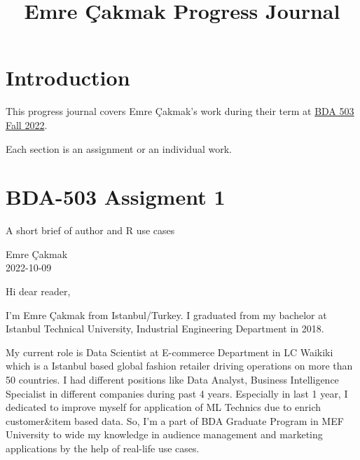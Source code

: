 \documentclass[
  letterpaper,
  DIV=11,
  numbers=noendperiod]{scrreprt}
\title{Emre Çakmak Progress Journal}
\author{}
\date{}
\renewcommand*\contentsname{Table of contents}
\newcommand\contentsname{Table of contents}
\begin{document}
\maketitle
\ifdefined\Shaded\renewenvironment{Shaded}{\begin{tcolorbox}[enhanced, boxrule=0pt, sharp corners, borderline west={3pt}{0pt}{shadecolor}, breakable, interior hidden, frame hidden]}{\end{tcolorbox}}\fi

\renewcommand*\contentsname{Table of contents}
{
\hypersetup{linkcolor=}
\setcounter{tocdepth}{2}
\tableofcontents
}

\hypertarget{introduction}{%
\chapter*{Introduction}\label{introduction}}

This progress journal covers Emre Çakmak's work during their term at
\href{https://mef-bda503.github.io/fall22/}{BDA 503 Fall 2022}.

Each section is an assignment or an individual work.


\hypertarget{bda-503-assigment-1}{%
\chapter{BDA-503 Assigment 1}\label{bda-503-assigment-1}}

A short brief of author and R use cases

Emre Çakmak\\
2022-10-09

\hfill\break

Hi dear reader,

I'm Emre Çakmak from Istanbul/Turkey. I graduated from my bachelor at
Istanbul Technical University, Industrial Engineering Department in
2018.

My current role is Data Scientist at E-commerce Department in LC Waikiki
which is a Istanbul based global fashion retailer driving operations on
more than 50 countries. I had different positions like Data Analyst,
Business Intelligence Specialist in different companies during past 4
years. Especially in last 1 year, I dedicated to improve myself for
application of ML Technics due to enrich customer\&item based data. So,
I'm a part of BDA Graduate Program in MEF University to wide my
knowledge in audience management and marketing applications by the help
of real-life use cases.
\end{document}
